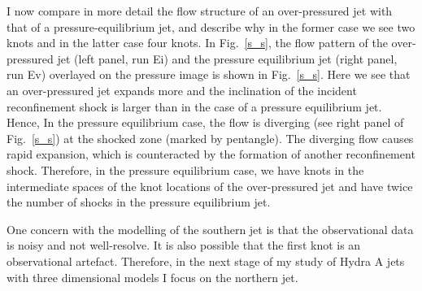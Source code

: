 I now compare in more detail the flow structure of an over-pressured jet with that of a pressure-equilibrium jet, and describe why in the former case we see two knots and in the latter case four knots. In Fig.~\ref{s_s}, the flow pattern of the over-pressured jet (left panel, run Ei) and the pressure equilibrium jet (right panel, run Ev) overlayed on the pressure image is shown in Fig.~\ref{s_s}. Here we see that an over-pressured jet expands more and the inclination of the incident reconfinement shock is larger than in the case of a pressure equilibrium jet. Hence, In the pressure equilibrium case, the flow is diverging (see right panel of Fig.~\ref{s_s}) at the shocked zone (marked by pentangle). The diverging flow causes rapid expansion, which is counteracted by the formation of another reconfinement shock. Therefore, in the pressure equilibrium case, we have knots in the intermediate spaces of the knot locations of the over-pressured jet and have twice the number of shocks in the pressure equilibrium jet. 

One concern with the modelling of the southern jet is that the observational data is noisy and not well-resolve. It is also possible that the first knot is an observational artefact. Therefore, in the next stage of my study of Hydra A jets with three dimensional models I focus on the northern jet. 



